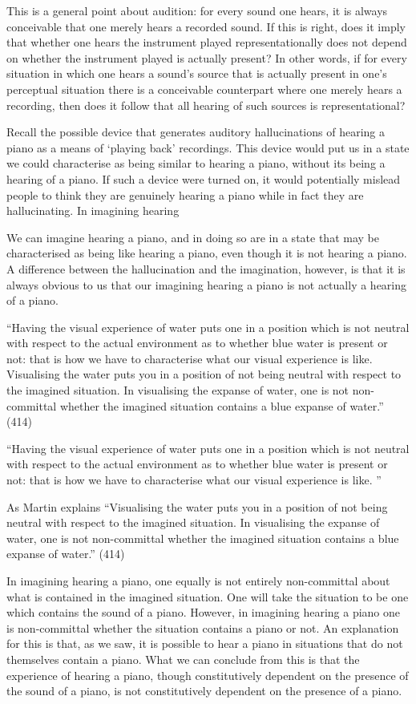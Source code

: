 \documentclass[sloppy, journal, git, bytitle, dodraft]{humapap}
\begin{document}
This is a general point about audition: for every sound one hears, it is always conceivable that one merely hears a recorded sound. If this is right, does it imply that whether one hears the instrument played representationally does not depend on whether the instrument played is actually present? In other words, if for every situation in which one hears a sound's source that is actually present in one's perceptual situation there is a conceivable counterpart where one merely hears a recording, then does it follow that all hearing of such sources is representational? 

Recall the possible device that generates auditory hallucinations of hearing a piano as a means of `playing back' recordings. This device would put us in a state we could characterise as being similar to hearing a piano, without its being a hearing of a piano. If such a device were turned on, it would potentially mislead people to think they are genuinely hearing  a piano while in fact they are hallucinating. In imagining hearing 


We can imagine hearing a piano, and in doing so are in a state that may be characterised as being like hearing a piano, even though it is not hearing a piano. A difference between the hallucination and the imagination, however, is that it is always obvious to us that our imagining hearing a piano is not actually a hearing of a piano. 

``Having the visual experience of water puts one in a position which is not neutral with respect to the actual environment as to whether blue water is present or not: that is how we have to characterise what our visual experience is like. Visualising the water puts you in a position of not being neutral with respect to the imagined situation. In visualising the expanse of water, one is not non-committal whether the imagined situation contains a blue expanse of water.'' (414)

``Having the visual experience of water puts one in a position which is not neutral with respect to the actual environment as to whether blue water is present or not: that is how we have to characterise what our visual experience is like. ''

As Martin explains ``Visualising the water puts you in a position of not being neutral with respect to the imagined situation. In visualising the expanse of water, one is not non-committal whether the imagined situation contains a blue expanse of water.'' (414)

In imagining hearing a piano, one equally is not entirely non-committal about what is contained in the imagined situation. One will take the situation to be one which contains the sound of a piano. However, in imagining hearing a piano one is non-committal whether the situation contains a piano or not. An explanation for this is that, as we saw, it is possible to hear a piano in situations that do not themselves contain a piano. What we can conclude from this is that the experience of hearing a piano, though constitutively dependent on the presence of the sound of a piano, is not constitutively dependent on the presence of a piano. 
\end{document}
